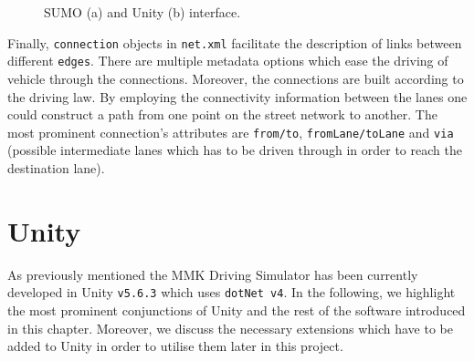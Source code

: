 \begin{figure}[htb]
	\centering
	\caption{SUMO (a) and Unity (b) interface.}
\end{figure}

Finally, \texttt{connection} objects in \texttt{net.xml} facilitate the description of links between different \texttt{edges}. There are multiple metadata options which ease the driving of vehicle through the connections. Moreover, the connections are built according to the driving law. By employing the connectivity information between the lanes one could construct a path from one point on the street network to another. The most prominent connection's attributes are \texttt{from/to}, \texttt{fromLane/toLane} and \texttt{via} (possible intermediate lanes which has to be driven through in order to reach the destination lane). 

\section{Unity}
\label{ch:unity}
As previously mentioned the MMK Driving Simulator has been currently developed  in Unity \texttt{v5.6.3} which uses \texttt{dotNet v4}. In the following, we highlight the most prominent conjunctions of Unity and the rest of the software introduced in this chapter. Moreover, we discuss the necessary extensions which have to be added to Unity in order to utilise them later in this project.

